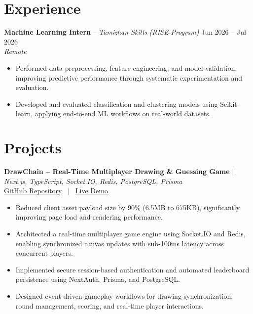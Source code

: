 \documentclass[10pt, a4paper]{article}
\begin{document}

\section{Experience}

\textbf{Machine Learning Intern} -- \textit{Tamizhan Skills (RISE Program)} \hfill Jun 2026 -- Jul 2026 \\
\textit{\small{Remote}} \\
\begin{itemize}

    \item Performed data preprocessing, feature engineering, and model validation, improving predictive performance through systematic experimentation and evaluation.

    \item Developed and evaluated classification and clustering models using Scikit-learn, applying end-to-end ML workflows on real-world datasets.

\end{itemize}
\vspace{2pt}



\section{Projects}

\textbf{DrawChain -- Real-Time Multiplayer Drawing \& Guessing Game} $|$ \textit{Next.js, TypeScript, Socket.IO, Redis, PostgreSQL, Prisma} \\

\small{
\href{https://github.com/PankajKumar-11/DrawChain}{GitHub Repository}
 \ $|$ \ \href{https://demo.example.com}{Live Demo}
} \\

\begin{itemize}

    \item Reduced client asset payload size by 90\% (6.5MB to 675KB), significantly improving page load and rendering performance.

    \item Architected a real-time multiplayer game engine using Socket.IO and Redis, enabling synchronized canvas updates with sub-100ms latency across concurrent players.

    \item Implemented secure session-based authentication and automated leaderboard persistence using NextAuth, Prisma, and PostgreSQL.

    \item Designed event-driven gameplay workflows for drawing synchronization, round management, scoring, and real-time player interactions.

\end{itemize}
\vspace{2pt}
\end{document}
